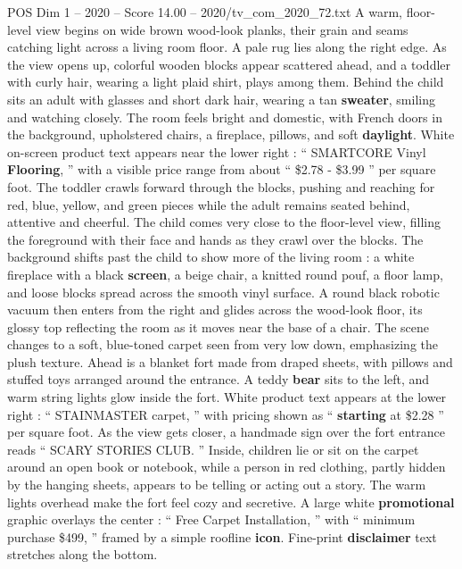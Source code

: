 \begin{textsample}{POS Dim 1 – 2020 – Score 14.00 – 2020/tv\_com\_2020\_72.txt}  \label{ex:f1_pos_019}
A warm, floor-level view begins on wide brown wood-look planks, their grain and seams catching light across a living room floor.
A pale rug lies along the right edge.
As the view opens up, colorful wooden blocks appear scattered ahead, and a toddler with curly hair, wearing a light plaid shirt, plays among them.
Behind the child sits an adult with glasses and short dark hair, wearing a tan \textbf{sweater}, smiling and watching closely.
The room feels bright and domestic, with French doors in the background, upholstered chairs, a fireplace, pillows, and soft \textbf{daylight}.
White on-screen product text appears near the lower right : “ SMARTCORE Vinyl \textbf{Flooring}, ” with a visible price range from about “ \$2.78 - \$3.99 ” per square foot.
The toddler crawls forward through the blocks, pushing and reaching for red, blue, yellow, and green pieces while the adult remains seated behind, attentive and cheerful.
The child comes very close to the floor-level view, filling the foreground with their face and hands as they crawl over the blocks.
The background shifts past the child to show more of the living room : a white fireplace with a black \textbf{screen}, a beige chair, a knitted round pouf, a floor lamp, and loose blocks spread across the smooth vinyl surface.
A round black robotic vacuum then enters from the right and glides across the wood-look floor, its glossy top reflecting the room as it moves near the base of a chair.
The scene changes to a soft, blue-toned carpet seen from very low down, emphasizing the plush texture.
Ahead is a blanket fort made from draped sheets, with pillows and stuffed toys arranged around the entrance.
A teddy \textbf{bear} sits to the left, and warm string lights glow inside the fort.
White product text appears at the lower right : “ STAINMASTER carpet, ” with pricing shown as “ \textbf{starting} at \$2.28 ” per square foot.
As the view gets closer, a handmade sign over the fort entrance reads “ SCARY STORIES CLUB. ” Inside, children lie or sit on the carpet around an open book or notebook, while a person in red clothing, partly hidden by the hanging sheets, appears to be telling or acting out a story.
The warm lights overhead make the fort feel cozy and secretive.
A large white \textbf{promotional} graphic overlays the center : “ Free Carpet Installation, ” with “ minimum purchase \$499, ” framed by a simple roofline \textbf{icon}.
Fine-print \textbf{disclaimer} text stretches along the bottom.

\end{textsample}
